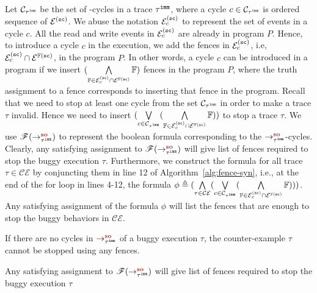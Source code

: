 Let $ \mathcal{C}_{{\tau}^{\mathtt{imm}}} $ be the set of \lso-cycles in a trace $ {\tau}^{\mathtt{imm}} $, 
where a cycle $ c \in \mathcal{C}_{{\tau}^{\mathtt{imm}}} $ is ordered sequence of 
$ \mathcal{E}^{(\texttt{sc})} $. We abuse the notation $\mathcal{E}^{(\texttt{sc})}_c$ to 
represent the set of events in a cycle $ c $. 
All the read and write events in $\mathcal{E}^{(\texttt{sc})}_c$ are already in program $ P $. 
Hence, to introduce a cycle $ c $ in the execution, we add the fences in $\mathcal{E}^{(\texttt{sc})}_c$, i.e, 
$\mathcal{E}^{(\texttt{sc})}_c \cap \mathcal{E}^{\mathbb{F}(\texttt{sc})}$, in the program $ P $.
In other words, a cycle $ c $ can be introduced in a program if we insert 
$ (\bigwedge\limits_{{\mathbb{F}} \in \mathcal{E}^{(\texttt{sc})}_c \cap 
\mathcal{E}^{\mathbb{F}(\texttt{sc})}} {\mathbb{F}})$ fences in the program $ P $, 
where the truth assignment to a fence corresponds to inserting that fence 
in the program.
Recall that we need to stop at least one cycle from the set 
$ \mathcal{C}_{{\tau}^{\mathtt{imm}}} $ in order to make a trace $ \tau $ invalid.
Hence we need to insert $ (\bigvee\limits_{c \in \mathcal{C}_{{\tau}^{\mathtt{imm}}}} (\bigwedge\limits_{{\mathbb{F}} \in \mathcal{E}^{(\texttt{sc})}_c \cap 
\mathcal{E}^{\mathbb{F}(\texttt{sc})}} {\mathbb{F}})) $ to stop a trace $ \tau $. 
We use $\formula{\so{\imm{\tau}}{}{}}$ to represent the boolean formula 
corresponding to the $ \so{\imm{\tau}}{}{} $-cycles.
Clearly, any satisfying assignment to $ \formula{\so{\imm{\tau}}{}{}} $ 
will give list of fences required to stop the buggy execution $ \tau $.
%
Furthermore, we construct the formula for all trace 
$ \tau \in \mathcal{CE} $ by conjuncting them in 
line 12 of Algorithm~\ref{alg:fence-syn}, i.e., 
at the end of the for loop in lines 4-12, the formula 
$ \phi \triangleq (\bigwedge\limits_{\tau \in \mathcal{CE}} 
(\bigvee\limits_{c \in \mathcal{C}_{{\tau}^{\mathtt{imm}}}} 
(\bigwedge\limits_{{\mathbb{F}} \in \mathcal{E}^{(\texttt{sc})}_c \cap \mathcal{E}^{\mathbb{F}(\texttt{sc})}} {\mathbb{F}}))) $.
Any satisfying assignment of the formula $\phi$ will list the fences that 
are enough to stop the buggy behaviors in $ \mathcal{CE} $.


\begin{lemma}
	If there are no cycles in $\so{\imm{\tau}}{}{}$ of a buggy execution 
	$\tau$, the counter-example $ \tau $ cannot be stopped using any \cc 
	fences.
\end{lemma}

\begin{theorem}
	Any satisfying assignment to $ \formula{\so{\imm{\tau}}{}{}} $ 
	will give list of fences required to stop the buggy execution $ \tau $
\end{theorem}


